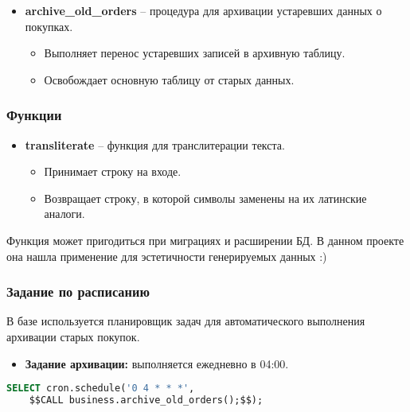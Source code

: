 \begin{itemize}
    \item \textbf{archive\_old\_orders} – процедура для архивации устаревших данных о покупках.
    \begin{itemize}
        \item Выполняет перенос устаревших записей в архивную таблицу.
        \item Освобождает основную таблицу от старых данных.
    \end{itemize}
\end{itemize}

\subsubsection{Функции}

\begin{itemize}
    \item \textbf{transliterate} – функция для транслитерации текста.
    \begin{itemize}
        \item Принимает строку на входе.
        \item Возвращает строку, в которой символы заменены на их латинские аналоги.
    \end{itemize}
\end{itemize}

Функция может пригодиться при миграциях и расширении БД.
В данном проекте она нашла применение для эстетичности генерируемых данных :)

\subsubsection{Задание по расписанию}

В базе используется планировщик задач для автоматического выполнения архивации старых покупок.

\begin{itemize}
    \item \textbf{Задание архивации:} выполняется ежедневно в 04:00.
\end{itemize}

\begin{lstlisting}[language=SQL, frame=single, keepspaces=true, showstringspaces=false, basicstyle=\normalsize\ttfamily, breaklines=true,label={lst:cronsql}]
SELECT cron.schedule('0 4 * * *',
    $$CALL business.archive_old_orders();$$);
\end{lstlisting}

